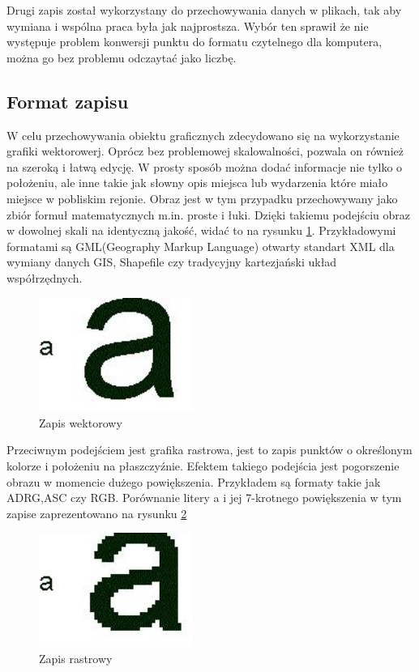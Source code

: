 Drugi zapis został wykorzystany do przechowywania danych w plikach, tak aby wymiana i wspólna praca była jak najprostsza. Wybór ten sprawił że nie występuje problem konwersji punktu do formatu czytelnego dla komputera, można go bez problemu odczaytać jako liczbę.

\subsection{Format zapisu}
\label{subsec:zapisWektorowy}

W celu przechowywania obiektu graficznych zdecydowano się na wykorzystanie grafiki wektorowerj.  Oprócz bez problemowej skalowalności, pozwala on również na szeroką i łatwą edycję. W prosty sposób można dodać informacje nie tylko o położeniu, ale inne takie jak słowny opis miejsca lub wydarzenia które miało miejsce w pobliskim rejonie.
Obraz jest w tym przypadku przechowywany jako zbiór formuł matematycznych m.in. proste i łuki. Dzięki takiemu podejściu obraz w dowolnej skali na identyczną jakość, widać to na rysunku \ref{fig:wekt}. Przykładowymi formatami są GML(Geography Markup Language) otwarty standart XML dla wymiany danych GIS, Shapefile czy tradycyjny kartezjański układ współrzędnych.

  \begin{figure}[H]
  \centering
    \includegraphics[width=50mm]{ge/a1.jpg}
  \caption{Zapis wektorowy}
  \label{fig:wekt}
  \end{figure}

Przeciwnym podejściem jest grafika rastrowa, jest to zapis punktów o określonym kolorze i położeniu na płaszczyźnie. Efektem takiego podejścia jest pogorszenie obrazu w momencie dużego powiększenia. Przykładem są formaty takie jak ADRG,ASC czy RGB.
Porównanie litery a i jej 7-krotnego powiększenia w tym zapise zaprezentowano na rysunku \ref{fig:rast}
  \begin{figure}[H]
  \centering
    \includegraphics[width=50mm]{ge/a2.jpg}
  \caption{Zapis rastrowy}
  \label{fig:rast}
  \end{figure}

